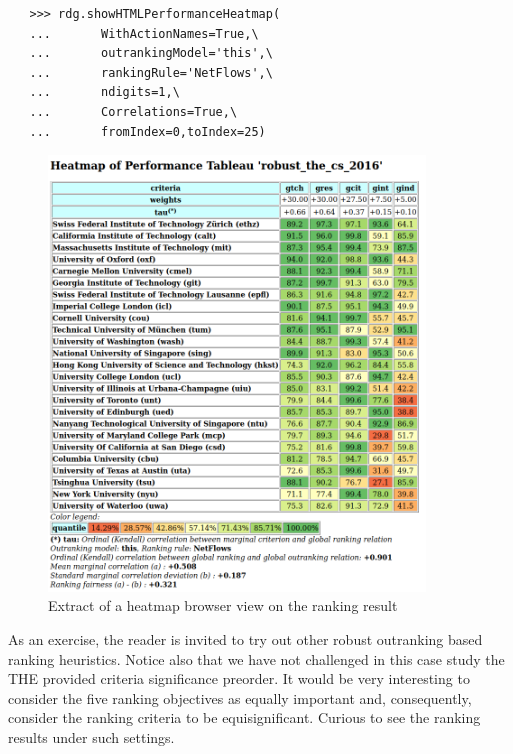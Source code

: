 \begin{lstlisting}
   >>> rdg.showHTMLPerformanceHeatmap(
   ...       WithActionNames=True,\
   ...       outrankingModel='this',\
   ...       rankingRule='NetFlows',\
   ...       ndigits=1,\
   ...       Correlations=True,\
   ...       fromIndex=0,toIndex=25)
 \end{lstlisting}

\begin{figure}[h]
\includegraphics[width=10cm]{Figures/theHeatmap.png}
\caption{Extract of a heatmap browser view on the \NetFlows ranking result}
\label{fig:13.4}       %
\end{figure}

As an exercise, the reader is invited to try out other robust outranking based ranking heuristics. Notice also that we have not challenged in this case study the THE provided criteria significance preorder. It would be very interesting to consider the five ranking objectives as equally important and, consequently, consider the ranking criteria to be equisignificant. Curious to see the ranking results under such settings.
 
